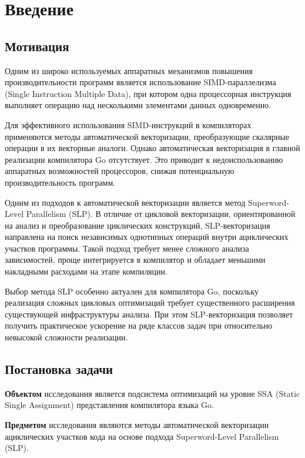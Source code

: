 \section{Введение}
\label{sec:Chapter0} 

\subsection{Мотивация}
Одним из широко используемых аппаратных механизмов повышения производительности программ
является использование SIMD-параллелизма (Single Instruction Multiple Data),
при котором одна процессорная инструкция выполняет операцию над несколькими элементами данных одновременно.

Для эффективного использования SIMD-инструкций в компиляторах применяются методы автоматической векторизации,
преобразующие скалярные операции в их векторные аналоги.
Однако автоматическая векторизация в главной реализации компилятора Go отсутствует. 
Это приводит к недоиспользованию аппаратных возможностей процессоров, снижая потенциальную производительность программ.

Одним из подходов к автоматической векторизации является метод Superword-Level Parallelism (SLP). 
В отличие от цикловой векторизации, ориентированной на анализ и преобразование циклических конструкций,
SLP-векторизация направлена на поиск независимых однотипных операций внутри ациклических участков программы.
Такой подход требует менее сложного анализа зависимостей, проще интегрируется в компилятор
и обладает меньшими накладными расходами на этапе компиляции.

Выбор метода SLP особенно актуален для компилятора Go, поскольку реализация сложных цикловых оптимизаций 
требует существенного расширения существующей инфраструктуры анализа. 
При этом SLP-векторизация позволяет получить практическое ускорение на ряде классов задач при относительно невысокой сложности реализации.


\subsection{Постановка задачи}

\textbf{Объектом} исследования является подсистема оптимизаций на уровне SSA (Static Single Assignment) представления компилятора языка Go.

\textbf{Предметом} исследования являются методы автоматической векторизации ациклических участков кода на основе подхода Superword-Level Parallelism (SLP).

